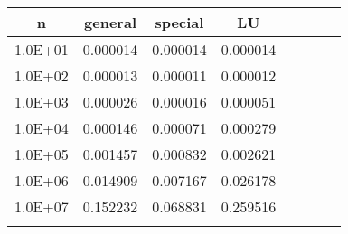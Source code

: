 \begin{tabular}{|c|c|c|c|c|c|c|c|}
	\hline
	n&general&special&LU\\
	\hline
	1.0E+01&0.000014&0.000014&0.000014\\
	\hline
	1.0E+02&0.000013&0.000011&0.000012\\
	\hline
	1.0E+03&0.000026&0.000016&0.000051\\
	\hline
	1.0E+04&0.000146&0.000071&0.000279\\
	\hline
	1.0E+05&0.001457&0.000832&0.002621\\
	\hline
	1.0E+06&0.014909&0.007167&0.026178\\
	\hline
	1.0E+07&0.152232&0.068831&0.259516\\
	\hline
	\\
\hline
\end{tabular}